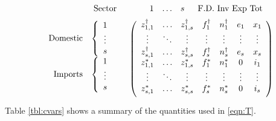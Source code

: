 \documentclass[a4paper]{article}
\begin{document}
\begin{equation}\label{eqn:T}
\begin{array}{rc}
\begin{array}{cc} & \mbox{Sector} \end{array} 
& 
\begin{array}{cccc} \hspace*{4mm}1 & \mathellipsis & s & \hspace*{2mm} \mbox{F.D. Inv Exp Tot} \end{array} \vspace*{2mm} \\
\begin{array}{r}
\begin{array}{rc}
\mbox{Domestic} & \left\{ \begin{array}{c}
1 \\
\vdots \\
s
\end{array} \right. \\
\mbox{Imports} & \left\{ \begin{array}{c}
1 \\
\vdots \\
s \\
\end{array} \right.
\end{array} \vspace*{2mm} \\
\end{array} &
\left( \begin{array}{ccccccc}
z^{\dag}_{1,1} & \mathellipsis & z^{\dag}_{1,s} & f^\dag_{1} & n^\dag_{1} & e_{1} & x_1 \\
\vdots & \ddots & \vdots & \vdots & \vdots & \vdots & \vdots \\
z^{\dag}_{s,1} & \mathellipsis & z^{\dag}_{s,s} & f^\dag_{s} & n^\dag_{s} & e_{s} & x_{s} \\
z^*_{1,1} & \mathellipsis & z^*_{1,s} & f^*_{1} & n^*_{1} & 0 & i_1 \\
\vdots & \ddots & \vdots & \vdots & \vdots & \vdots & \vdots \\
z^*_{s,1} & \mathellipsis & z^*_{s,s} & f^*_{s} & n^*_{s} & 0 & i_{s} \vspace*{2mm} \\
\end{array} \right)
\end{array}
\end{equation}
Table \ref{tbl:cvars} shows a summary of the quantities used in \eqref{eqn:T}.
\end{document}
